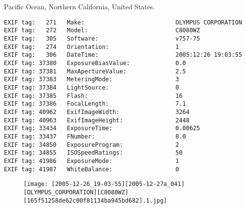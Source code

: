 \section{\protect{}}
\noindent Pacific Ocean, Northern California, United States.
\noindent
\begin{lstlisting}
EXIF tag:   271   Make:                          OLYMPUS CORPORATION
EXIF tag:   272   Model:                         C8080WZ
EXIF tag:   305   Software:                      v757-75
EXIF tag:   274   Orientation:                   1
EXIF tag:   306   DateTime:                      2005:12:26 19:03:55
EXIF tag: 37380   ExposureBiasValue:             0.0
EXIF tag: 37381   MaxApertureValue:              2.5
EXIF tag: 37383   MeteringMode:                  3
EXIF tag: 37384   LightSource:                   0
EXIF tag: 37385   Flash:                         16
EXIF tag: 37386   FocalLength:                   7.1
EXIF tag: 40962   ExifImageWidth:                3264
EXIF tag: 40963   ExifImageHeight:               2448
EXIF tag: 33434   ExposureTime:                  0.00625
EXIF tag: 33437   FNumber:                       8.0
EXIF tag: 34850   ExposureProgram:               2
EXIF tag: 34855   ISOSpeedRatings:               50
EXIF tag: 41986   ExposureMode:                  1
EXIF tag: 41987   WhiteBalance:                  0

\end{lstlisting}
\clearpage
\begin{figure}
\raggedleft
\texttt{[image: [2005-12-26\_19-03-55][2005-12-27a\_041][OLYMPUS\_CORPORATION][C8080WZ][165f51258de62c00f81134ba945bd682].1.jpg]}
\end{figure}


\clearpage

